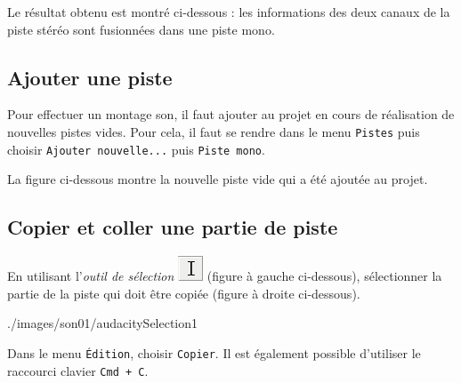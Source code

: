 
Le résultat obtenu est montré ci-dessous : les informations des deux canaux de la piste stéréo sont fusionnées dans une piste mono.





\subsection{Ajouter une piste}\label{Son1ajouterPiste}

Pour effectuer un montage son, il faut ajouter au projet en cours de réalisation de nouvelles pistes vides. Pour cela, il faut se rendre dans le menu \texttt{Pistes} puis choisir \texttt{Ajouter nouvelle...} puis \texttt{Piste mono}.   


La figure ci-dessous montre la nouvelle piste vide qui a été ajoutée au projet.






\subsection{Copier et coller une partie de piste}\label{Son1copierColler} 

En utilisant l'\emph{outil de sélection} \includegraphics[width=.5cm]{./images/son01/audacityIconeSelection} (figure à gauche ci-dessous), sélectionner la partie de la piste qui doit être copiée (figure à droite ci-dessous).

                {./images/son01/audacitySelection1}{\textwidth}


Dans le menu \texttt{Édition}, choisir \texttt{Copier}. Il est également possible d'utiliser le raccourci clavier \texttt{Cmd + C}.   


